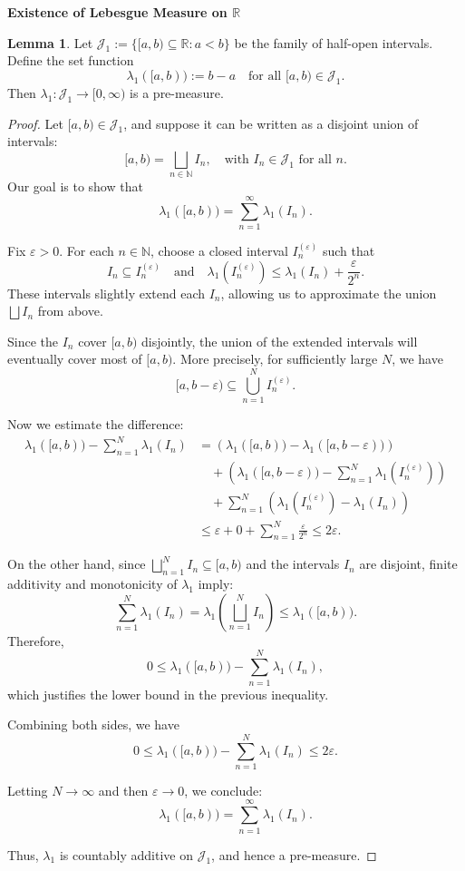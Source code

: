 \documentclass[12pt]{article}
\theoremstyle{definition}
\newtheorem{lemma}[theorem]{Lemma}
\begin{document}
\medskip
\begin{center}
\textbf{Existence of Lebesgue Measure on \( \mathbb{R} \)}
\end{center}

\medskip
\begin{lemma}
Let $\mathcal{J}_1 := \{ [a,b) \subseteq \mathbb{R} : a < b \}$ be the family of half-open intervals. Define the set function
\[
\lambda_1([a,b)) := b - a \quad \text{for all } [a,b) \in \mathcal{J}_1.
\]
Then $\lambda_1 : \mathcal{J}_1 \to [0,\infty)$ is a pre-measure.
\end{lemma}

\begin{proof}
Let $[a,b) \in \mathcal{J}_1$, and suppose it can be written as a disjoint union of intervals:
\[
[a,b) = \bigsqcup_{n \in \mathbb{N}} I_n, \quad \text{with } I_n \in \mathcal{J}_1 \text{ for all } n.
\]
Our goal is to show that
\[
\lambda_1([a,b)) = \sum_{n=1}^\infty \lambda_1(I_n).
\]

Fix $\varepsilon > 0$. For each $n \in \mathbb{N}$, choose a closed interval $I_n^{(\varepsilon)}$ such that
\[
I_n \subseteq I_n^{(\varepsilon)} \quad \text{and} \quad \lambda_1(I_n^{(\varepsilon)}) \leq \lambda_1(I_n) + \frac{\varepsilon}{2^n}.
\]
These intervals slightly extend each $I_n$, allowing us to approximate the union $\bigsqcup I_n$ from above.

Since the $I_n$ cover $[a,b)$ disjointly, the union of the extended intervals will eventually cover most of $[a,b)$. More precisely, for sufficiently large $N$, we have
\[
[a, b - \varepsilon) \subseteq \bigcup_{n=1}^N I_n^{(\varepsilon)}.
\]

Now we estimate the difference:
\begin{align*}
\lambda_1([a,b)) - \sum_{n=1}^N \lambda_1(I_n)
&= \left( \lambda_1([a,b)) - \lambda_1([a,b - \varepsilon)) \right) \\
&\quad + \left( \lambda_1([a,b - \varepsilon)) - \sum_{n=1}^N \lambda_1(I_n^{(\varepsilon)}) \right) \\
&\quad + \sum_{n=1}^N \left( \lambda_1(I_n^{(\varepsilon)}) - \lambda_1(I_n) \right) \\
&\leq \varepsilon + 0 + \sum_{n=1}^N \frac{\varepsilon}{2^n} \leq 2\varepsilon.
\end{align*}

On the other hand, since $\bigsqcup_{n=1}^N I_n \subseteq [a,b)$ and the intervals $I_n$ are disjoint, finite additivity and monotonicity of $\lambda_1$ imply:
\[
\sum_{n=1}^N \lambda_1(I_n) = \lambda_1\left( \bigsqcup_{n=1}^N I_n \right) \leq \lambda_1([a,b)).
\]
Therefore,
\[
0 \leq \lambda_1([a,b)) - \sum_{n=1}^N \lambda_1(I_n),
\]
which justifies the lower bound in the previous inequality.

Combining both sides, we have
\[
0 \leq \lambda_1([a,b)) - \sum_{n=1}^N \lambda_1(I_n) \leq 2\varepsilon.
\]

Letting $N \to \infty$ and then $\varepsilon \to 0$, we conclude:
\[
\lambda_1([a,b)) = \sum_{n=1}^\infty \lambda_1(I_n).
\]

Thus, $\lambda_1$ is countably additive on $\mathcal{J}_1$, and hence a pre-measure.
\end{proof}
\end{document}
